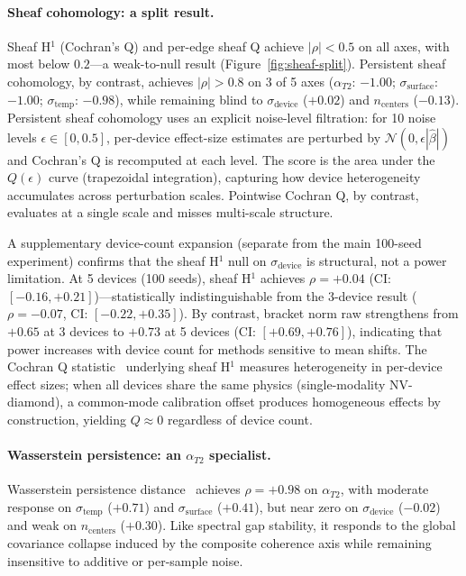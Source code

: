 \documentclass[11pt]{article}
\begin{document}
\paragraph{Sheaf cohomology: a split result.}
Sheaf H$^1$ (Cochran's Q) and per-edge sheaf Q achieve $|\rho| < 0.5$
on all axes, with most below $0.2$---a weak-to-null result
(Figure~\ref{fig:sheaf-split}).
Persistent sheaf cohomology, by contrast, achieves
$|\rho| > 0.8$ on 3 of 5 axes ($\alpha_{T2}$: $-1.00$;
$\sigma_\text{surface}$: $-1.00$; $\sigma_\text{temp}$: $-0.98$),
while remaining blind to $\sigma_\text{device}$ ($+0.02$) and
$n_\text{centers}$ ($-0.13$).  Persistent sheaf cohomology uses an explicit noise-level
filtration: for 10 noise levels $\epsilon \in [0, 0.5]$, per-device
effect-size estimates are perturbed by $\mathcal{N}(0,
\epsilon|\hat\beta|)$ and Cochran's Q is recomputed at each level.
The score is the area under the $Q(\epsilon)$ curve (trapezoidal
integration), capturing how device heterogeneity accumulates across
perturbation scales.  Pointwise Cochran Q, by contrast, evaluates at a
single scale and misses multi-scale structure.

A supplementary device-count expansion (separate from the main
100-seed experiment) confirms that the sheaf H$^1$ null on
$\sigma_\text{device}$ is structural, not a power limitation.
At 5 devices (100 seeds), sheaf H$^1$ achieves $\rho = +0.04$
(CI: $[-0.16, +0.21]$)---statistically indistinguishable from the
3-device result ($\rho = -0.07$, CI: $[-0.22, +0.35]$).  By
contrast, bracket norm raw strengthens from $+0.65$ at 3 devices
to $+0.73$ at 5 devices (CI: $[+0.69, +0.76]$), indicating that
power increases with device count for methods sensitive to mean
shifts.  The Cochran Q statistic~\citep{cochran1954combination} underlying sheaf
H$^1$ measures heterogeneity in per-device effect sizes; when all devices share
the same physics (single-modality NV-diamond), a common-mode
calibration offset produces homogeneous effects by construction,
yielding $Q \approx 0$ regardless of device count.

\paragraph{Wasserstein persistence: an $\alpha_{T2}$ specialist.}
Wasserstein persistence distance~\citep{villani2009optimal} achieves
$\rho = +0.98$ on $\alpha_{T2}$, with moderate response on
$\sigma_\text{temp}$ ($+0.71$) and $\sigma_\text{surface}$ ($+0.41$),
but near zero on $\sigma_\text{device}$ ($-0.02$) and weak on
$n_\text{centers}$ ($+0.30$).
Like spectral gap stability, it responds to the global covariance
collapse induced by the composite coherence axis while remaining
insensitive to additive or per-sample noise.
\end{document}
